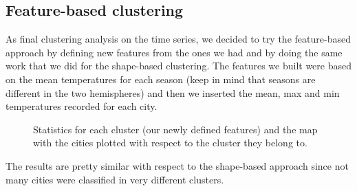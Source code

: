 \subsection{Feature-based clustering}
As final clustering analysis on the time series, we decided to try the feature-based approach by defining new features from the ones we had and by doing the same work that we did for the shape-based clustering. The features we built were based on the mean temperatures for each season (keep in mind that seasons are different in the two hemispheres) and then we inserted the mean, max and min temperatures recorded for each city.
\begin{figure}[H]
    \centering
    \caption{Statistics for each cluster (our newly defined features) and the map with the cities plotted with respect to the cluster they belong to.}
    \label{fig:timeseries_fbc_plot_map}
\end{figure}
The results are pretty similar with respect to the shape-based approach since not many cities were classified in very different clusters.
